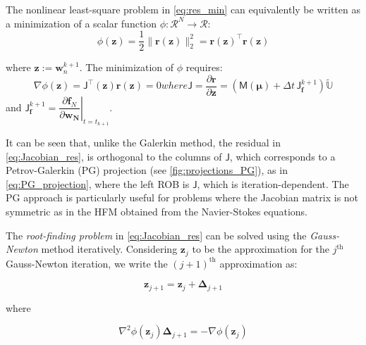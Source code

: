 \documentclass[11pt]{article}
\renewcommand{\vec}[1]{\mathbf{#1}}
\newcommand{\mat}[1]{\mathsf{#1}}
\begin{document}
The nonlinear least-square problem in \cref{eq:res_min} can equivalently be written as a minimization of a scalar function $\phi: \mathcal{R}^N \rightarrow \mathcal{R}$:
\begin{equation}
\phi(\mathbf{z}) = \frac{1}{2} \|\mathbf{r}(\mathbf{z})\|_2^2 = \mathbf{r}(\mathbf{z})^{\top} \mathbf{r}(\vec{z})
\label{eq:gnat_opt}
\end{equation}

where $\vec{z} := \vec{w}^{k+1}_n$.
The minimization of $\phi$ requires:
\begin{subequations}

\begin{equation}
\nabla\phi(\vec{z})=\mat{J}^{\top}(\vec{z})\vec{r}(\vec{z}) = 0
\label{eq:Jacobian_res}
\end{equation}
where
\begin{equation}
\mat{J} = \dfrac{\partial\vec{r}}{\partial \vec{z}} = \left(\mat{M}(\boldsymbol{\mu}) + \Delta t\,\mat{J}^{k+1}_{\vec{f}}\right)\widetilde{\mathbb{U}} 
\label{eq:jacobian}
\end{equation}
\end{subequations}
and $\mat{J}^{k+1}_{\vec{f}} = \left.\dfrac{\partial{\vec{f}_N}}{\partial{\vec{\vec{w}_N}}}\right|_{t = t_{k+1}}$.

It can be seen that, unlike the Galerkin method, the residual in \cref{eq:Jacobian_res}, is orthogonal to the columns of $\mat{J}$, which corresponds to a Petrov-Galerkin (PG) projection \cite{Carlberg_2017Galerkin} (see \cref{fig:projections_PG}), as in \cref{eq:PG_projection}, where the left ROB  is $\mat{J}$, which is iteration-dependent. 
The PG approach is particularly useful for problems where the Jacobian matrix is not symmetric as in the HFM obtained from  the Navier-Stokes equations.


The \textit{root-finding problem } in \cref{eq:Jacobian_res} can be solved using the \textit{Gauss-Newton} method \cite{stanford_cme345,carlberg2013gnat} iteratively.
Considering $\vec{z}_j$ to be the approximation for the  $j^{\text{th}}$ Gauss-Newton iteration, we write the  $(j+1)^{\text{th}}$ approximation as:

\begin{equation}
\vec{z}_{j+1} = \vec{z}_{j} + \boldsymbol{\Delta}_{j+1}
\label{eq:GaussNewton_app}
\end{equation}

where

\begin{equation}
\nabla^2\phi(\vec{z}_j)\boldsymbol{\Delta}_{j+1} = -\nabla\phi(\vec{z}_j)
\label{eq:Gauss_newton_step}
\end{equation}
\end{document}
